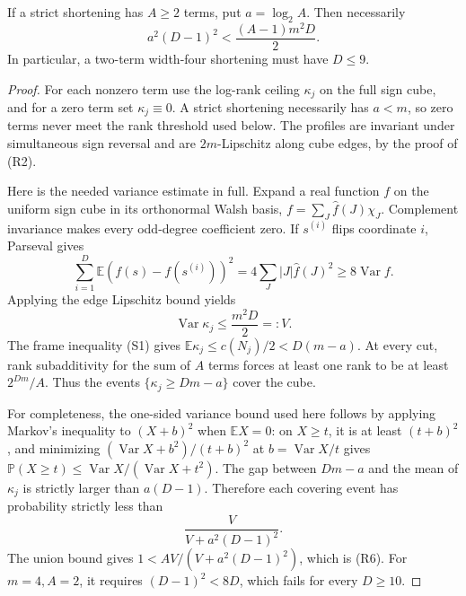 \begin{proposition}
\label{prop:shortening-dimension-bound}
If a strict shortening has $A\ge2$ terms, put $a=\log_2 A$.
Then necessarily
\[
 a^2(D-1)^2<\frac{(A-1)m^2D}{2}.                 \tag{R6}
\]
In particular, a two-term width-four shortening must have
$D\le9$.
\end{proposition}
\begin{proof}
For each nonzero term use the log-rank ceiling $\kappa_j$
on the full sign cube, and for a zero term set
$\kappa_j\equiv0$.  A strict shortening necessarily has
$a<m$, so zero terms never meet the rank threshold used below.
The profiles are invariant under
simultaneous sign reversal and are $2m$-Lipschitz along
cube edges, by the proof of (R2).

Here is the needed variance estimate in full.  Expand a
real function $f$ on the uniform sign cube in its orthonormal
Walsh basis, $f=\sum_J\widehat f(J)\chi_J$.
Complement invariance makes every odd-degree coefficient
zero.  If $s^{(i)}$ flips coordinate $i$, Parseval gives
\[
 \sum_{i=1}^D\mathbb E(f(s)-f(s^{(i)}))^2
 =4\sum_J|J|\widehat f(J)^2
 \ge8\operatorname{Var}f.
\]
Applying the edge Lipschitz bound yields
\[
 \operatorname{Var}\kappa_j\le\frac{m^2D}{2}=:V.
 \tag{R7}
\]
The frame inequality (S1) gives
$\mathbb E\kappa_j\le c(N_j)/2<D(m-a)$.
At every cut, rank subadditivity for the sum of $A$ terms
forces at least one rank to be at least $2^{Dm}/A$.
Thus the events $\{\kappa_j\ge Dm-a\}$ cover the cube.

For completeness, the one-sided variance bound used here
follows by applying Markov's inequality to $(X+b)^2$ when
$\mathbb EX=0$: on $X\ge t$, it is at least $(t+b)^2$,
and minimizing $(\operatorname{Var}X+b^2)/(t+b)^2$ at
$b=\operatorname{Var}X/t$ gives
$\mathbb P(X\ge t)\le\operatorname{Var}X/
(\operatorname{Var}X+t^2)$.
The gap between $Dm-a$ and the mean of $\kappa_j$ is
strictly larger than $a(D-1)$.  Therefore each covering
event has probability strictly less than
\[
 \frac{V}{V+a^2(D-1)^2}.
\]
The union bound gives $1<AV/(V+a^2(D-1)^2)$, which
is (R6).  For $m=4,A=2$, it requires
$(D-1)^2<8D$, which fails for every $D\ge10$.
\end{proof}

